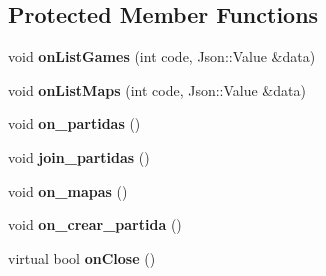 \subsection*{Protected Member Functions}
\begin{DoxyCompactItemize}
\item 
\hypertarget{classMainWindow_a84f1debb16a5d9433115085502664ff1}{void {\bfseries on\-List\-Games} (int code, Json\-::\-Value \&data)}\label{classMainWindow_a84f1debb16a5d9433115085502664ff1}

\item 
\hypertarget{classMainWindow_af1f2f2aa17dcf3f727dca0935e0f9903}{void {\bfseries on\-List\-Maps} (int code, Json\-::\-Value \&data)}\label{classMainWindow_af1f2f2aa17dcf3f727dca0935e0f9903}

\item 
\hypertarget{classMainWindow_a67675f346522095602ef474d1d4a5168}{void {\bfseries on\-\_\-partidas} ()}\label{classMainWindow_a67675f346522095602ef474d1d4a5168}

\item 
\hypertarget{classMainWindow_a9d05b4619e7e5424768cca963922968e}{void {\bfseries join\-\_\-partidas} ()}\label{classMainWindow_a9d05b4619e7e5424768cca963922968e}

\item 
\hypertarget{classMainWindow_a3a1541637c02219b285d5bf9bc6381a1}{void {\bfseries on\-\_\-mapas} ()}\label{classMainWindow_a3a1541637c02219b285d5bf9bc6381a1}

\item 
\hypertarget{classMainWindow_a42724db9575b3be2f1a734351ab51262}{void {\bfseries on\-\_\-crear\-\_\-partida} ()}\label{classMainWindow_a42724db9575b3be2f1a734351ab51262}

\item 
\hypertarget{classMainWindow_acc25dd6bdbfdf9d4cf04c4a099b00e54}{virtual bool {\bfseries on\-Close} ()}\label{classMainWindow_acc25dd6bdbfdf9d4cf04c4a099b00e54}

\end{DoxyCompactItemize}
